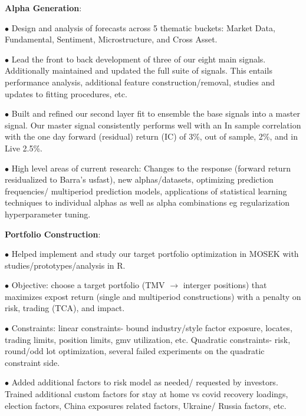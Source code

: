 \documentclass[a4paper,20pt]{article}
\newcommand{\resumeItem}[2]{
  \item\small{
    \textbf{#1}{: #2 \vspace{-2pt}}
  }
}
\begin{document}
    \resumeItem{Alpha Generation}\\
      $\bullet$ Design and analysis of forecasts across 5 thematic buckets:
      Market Data, Fundamental, Sentiment, Microstructure, and Cross
      Asset.

      $\bullet$ Lead the front to back development of three of our
      eight main signals. Additionally maintained and updated the full
      suite of signals. This entails performance analysis, additional
      feature construction/removal, studies and updates to fitting
      procedures, etc.

      $\bullet$ Built and refined our second layer fit to ensemble the
      base signals into a master signal. Our master signal
      consistently performs well with an In sample correlation with
      the one day forward (residual) return (IC) of 3\%, out of
      sample, 2\%, and in Live 2.5\%.

      $\bullet$ High level areas of current research: Changes to the
      response (forward return residualized to Barra's usfast), new
      alphas/datasets, optimizing prediction frequencies/ multiperiod
      prediction models, applications of statistical learning
      techniques to individual alphas as well as alpha combinations eg
      regularization hyperparameter tuning.

      \resumeItem{Portfolio Construction}\\

      $\bullet$ Helped implement and study our target portfolio
      optimization in MOSEK with studies/prototypes/analysis in R.

      $\bullet$ Objective: choose a target portfolio (TMV
      $\rightarrow$ interger positions) that maximizes expost return
      (single and multiperiod constructions) with a penalty on risk,
      trading (TCA), and impact.

      $\bullet$ Constraints: linear constraints- bound industry/style
      factor exposure, locates, trading limits, position limits, gmv
      utilization, etc. Quadratic constraints- risk, round/odd lot
      optimization, several failed experiments on the quadratic
      constraint side.

      $\bullet$ Added additional factors to risk model as needed/
      requested by investors. Trained additional custom factors for stay at home vs covid recovery loadings, election factors,
      China exposures related factors, Ukraine/ Russia
      factors, etc.

\end{document}

